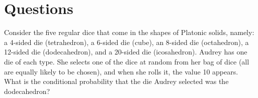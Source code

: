 \documentclass[answers]{exam}
\begin{document}
\section{Questions}
\begin{enumerate}
\begin{questions}
\question Consider the five regular dice that come in the shapes of Platonic solids, namely:
a 4-sided die (tetrahedron), a 6-sided die (cube), an 8-sided die (octahedron), a 12-sided die
(dodecahedron),  and a 20-sided die (icosahedron).  Audrey has one die of each type.  She
selects one of the dice at random from her bag of dice (all are equally likely to be chosen),
and when she rolls it, the value 10 appears.  What is the conditional probability that the die
Audrey selected was the dodecahedron?
    \begin{solution}
    
    \end{solution}


\end{questions}
\end{enumerate}
\end{document}
